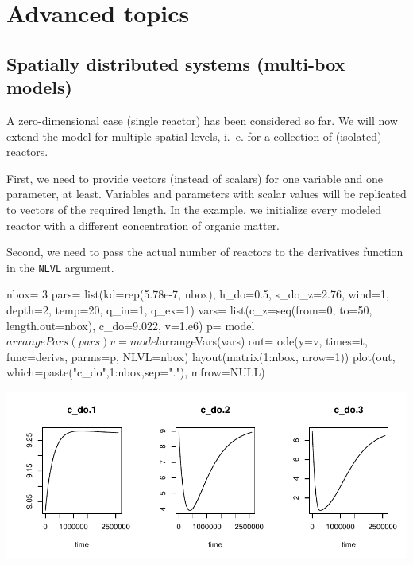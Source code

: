\documentclass[times,onecolumn]{article}
\begin{document}
\clearpage
\section{Advanced topics} \label{sec:advanced}


\subsection{Spatially distributed systems (multi-box models)} \label{sec:advanced:multibox}

A zero-dimensional case (single reactor) has been considered so far. We will now extend the model for multiple spatial levels, i.~e. for a collection of (isolated) reactors.

First, we need to provide vectors (instead of scalars) for one variable and one parameter, at least. Variables and parameters with scalar values will be replicated to vectors of the required length. In the example, we initialize every modeled reactor with a different concentration of organic matter.

Second, we need to pass the actual number of reactors to the derivatives function in the \verb!NLVL! argument.

\begin{Schunk}
\begin{Sinput}
 nbox= 3
 pars= list(kd=rep(5.78e-7, nbox), h_do=0.5, s_do_z=2.76, wind=1,
   depth=2, temp=20, q_in=1, q_ex=1)
 vars= list(c_z=seq(from=0, to=50, length.out=nbox), c_do=9.022,
   v=1.e6)
 p= model$arrangePars(pars)
 v= model$arrangeVars(vars)
 out= ode(y=v, times=t, func=derivs, parms=p, NLVL=nbox)
 layout(matrix(1:nbox, nrow=1))
 plot(out, which=paste("c_do",1:nbox,sep="."), mfrow=NULL)
\end{Sinput}
\end{Schunk}
\includegraphics{rodeo-015}
\end{document}
